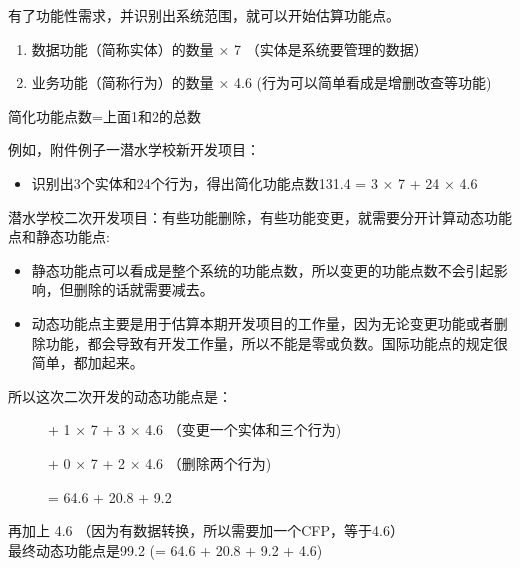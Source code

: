 有了功能性需求，并识别出系统范围，就可以开始估算功能点。

\begin{enumerate}
\tightlist
\item
  数据功能（简称实体）的数量 × 7 （实体是系统要管理的数据）
\item
  业务功能（简称行为）的数量 × 4.6 (行为可以简单看成是增删改查等功能)
\end{enumerate}

\begin{description}
\tightlist
\item[]
简化功能点数=上面1和2的总数
\end{description}

例如，附件例子一潜水学校新开发项目：

\begin{itemize}
\tightlist
\item
  识别出3个实体和24个行为，得出简化功能点数131.4 = 3 × 7 + 24 × 4.6
\end{itemize}

潜水学校二次开发项目：有些功能删除，有些功能变更，就需要分开计算动态功能点和静态功能点:

\begin{itemize}
\tightlist
\item
  静态功能点可以看成是整个系统的功能点数，所以变更的功能点数不会引起影响，但删除的话就需要减去。
\item
  动态功能点主要是用于估算本期开发项目的工作量，因为无论变更功能或者删除功能，都会导致有开发工作量，所以不能是零或负数。国际功能点的规定很简单，都加起来。
\end{itemize}

所以这次二次开发的动态功能点是：

\begin{description}
\item[]

+ 1 × 7 + 3 × 4.6 （变更一个实体和三个行为)

+ 0 × 7 + 2 × 4.6 （删除两个行为)

= 64.6 + 20.8 + 9.2
\end{description}

再加上 4.6 （因为有数据转换，所以需要加一个CFP，等于4.6）\\
最终动态功能点是99.2 (= 64.6 + 20.8 + 9.2 + 4.6)


